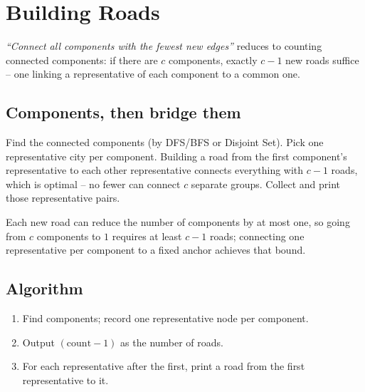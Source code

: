 \section{Building Roads}
\label{sec:cses-building-roads}


\begin{patternbox}
\emph{``Connect all components with the fewest new edges''} reduces to
counting connected components: if there are $c$ components, exactly $c-1$
new roads suffice -- one linking a representative of each component to a
common one.
\end{patternbox}

\subsection*{Components, then bridge them}

Find the connected components (by DFS/BFS or Disjoint Set). Pick one
representative city per component. Building a road from the first
component's representative to each other representative connects everything
with $c-1$ roads, which is optimal -- no fewer can connect $c$ separate
groups. Collect and print those representative pairs.

\begin{ideabox}
Each new road can reduce the number of components by at most one, so going
from $c$ components to $1$ requires at least $c-1$ roads; connecting one
representative per component to a fixed anchor achieves that bound.
\end{ideabox}

\subsection*{Algorithm}

\begin{enumerate}
  \item Find components; record one representative node per component.
  \item Output $(\text{count}-1)$ as the number of roads.
  \item For each representative after the first, print a road from the
        first representative to it.
\end{enumerate}

